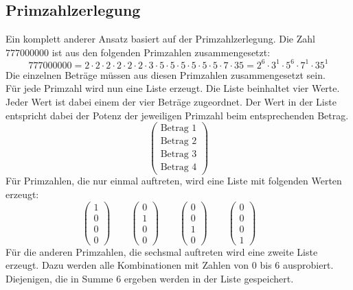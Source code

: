 \documentclass[10pt, fleqn]{article}
\begin{document}
\subsection{Primzahlzerlegung}
Ein komplett anderer Ansatz basiert auf der Primzahlzerlegung. Die Zahl 
$777000000$ ist aus den folgenden Primzahlen zusammengesetzt: 
\[ 777000000 = 2 \cdot 2 \cdot 2 \cdot 2 \cdot 2 \cdot 2 \cdot 3 
\cdot 5 \cdot 5 \cdot 5 \cdot 5 \cdot 5 \cdot 5 \cdot 7 \cdot 35 
= 2^6 \cdot 3^1 \cdot 5^6 \cdot 7^1 \cdot 35^1 \]
Die einzelnen Beträge müssen aus diesen Primzahlen zusammengesetzt sein. \\
Für jede Primzahl wird nun eine Liste erzeugt. Die Liste beinhaltet vier Werte. 
Jeder Wert ist dabei einem der vier Beträge zugeordnet. Der Wert in der Liste 
entspricht dabei der Potenz der jeweiligen Primzahl beim entsprechenden Betrag. 
\[ \begin{pmatrix}\text{Betrag 1}\\\text{Betrag 2}
\\\text{Betrag 3}\\\text{Betrag 4}\end{pmatrix} \]
Für Primzahlen, die nur einmal auftreten, wird eine Liste mit folgenden Werten 
erzeugt: 
\[ \begin{pmatrix}1\\0\\0\\0\end{pmatrix} \qquad 
   \begin{pmatrix}0\\1\\0\\0\end{pmatrix} \qquad 
   \begin{pmatrix}0\\0\\1\\0\end{pmatrix} \qquad 
   \begin{pmatrix}0\\0\\0\\1\end{pmatrix} \qquad \]
Für die anderen Primzahlen, die sechsmal auftreten wird eine zweite Liste 
erzeugt. Dazu werden alle Kombinationen mit Zahlen von 0 bis 6 ausprobiert. 
Diejenigen, die in Summe $6$ ergeben werden in der Liste gespeichert. 
\end{document}
